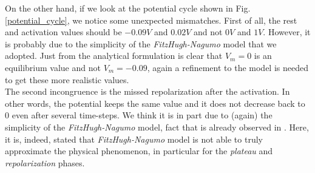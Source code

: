 \documentclass[a4paper,11pt]{article}
\begin{document}
\noindent On the other hand, if we look at the potential cycle shown in Fig. \ref{potential_cycle}, we notice some unexpected mismatches. First of all, the rest and activation values should be $-0.09V$ and $0.02V$ and not $0V$ and $1V$. However, it is probably due to the simplicity of the \emph{FitzHugh-Nagumo} model that we adopted. Just from the analytical formulation is clear that $V_m=0$ is an equilibrium value and not $V_m=-0.09$, again a refinement to the model is needed to get these more realistic values. \\
The second incongruence is the missed repolarization after the activation. In other words, the potential keeps the same value and it does not decrease back to 0 even after several time-steps. We think it is in part due to (again) the simplicity of the \emph{FitzHugh-Nagumo} model, fact that is already observed in \cite{colli_franzone_parallel}. Here, it is, indeed, stated that \emph{FitzHugh-Nagumo} model is not able to truly approximate the physical phenomenon, in particular for the \emph{plateau} and \emph{repolarization} phases.
\end{document}
